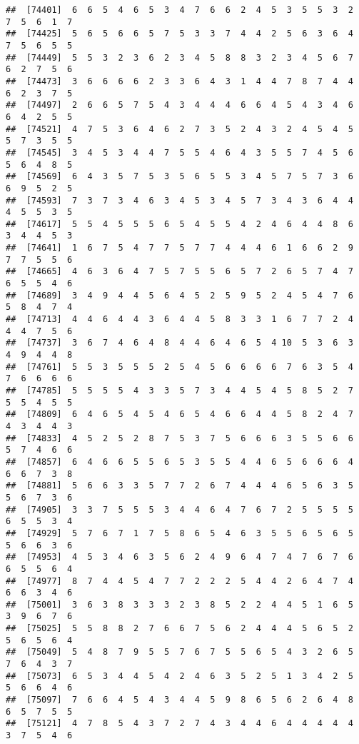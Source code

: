 \documentclass[
]{book}
\begin{document}
\begin{verbatim}
##  [74401]  6  6  5  4  6  5  3  4  7  6  6  2  4  5  3  5  5  3  2  7  5  6  1  7
##  [74425]  5  6  5  6  6  5  7  5  3  3  7  4  4  2  5  6  3  6  4  7  5  6  5  5
##  [74449]  5  5  3  2  3  6  2  3  4  5  8  8  3  2  3  4  5  6  7  6  2  7  5  6
##  [74473]  3  6  6  6  6  2  3  3  6  4  3  1  4  4  7  8  7  4  4  6  2  3  7  5
##  [74497]  2  6  6  5  7  5  4  3  4  4  4  6  6  4  5  4  3  4  6  6  4  2  5  5
##  [74521]  4  7  5  3  6  4  6  2  7  3  5  2  4  3  2  4  5  4  5  5  7  3  5  5
##  [74545]  3  4  5  3  4  4  7  5  5  4  6  4  3  5  5  7  4  5  6  5  6  4  8  5
##  [74569]  6  4  3  5  7  5  3  5  6  5  5  3  4  5  7  5  7  3  6  6  9  5  2  5
##  [74593]  7  3  7  3  4  6  3  4  5  3  4  5  7  3  4  3  6  4  4  4  5  5  3  5
##  [74617]  5  5  4  5  5  5  6  5  4  5  5  4  2  4  6  4  4  8  6  3  4  4  5  3
##  [74641]  1  6  7  5  4  7  7  5  7  7  4  4  4  6  1  6  6  2  9  7  7  5  5  6
##  [74665]  4  6  3  6  4  7  5  7  5  5  6  5  7  2  6  5  7  4  7  6  5  5  4  6
##  [74689]  3  4  9  4  4  5  6  4  5  2  5  9  5  2  4  5  4  7  6  5  8  4  7  4
##  [74713]  4  4  6  4  4  3  6  4  4  5  8  3  3  1  6  7  7  2  4  4  4  7  5  6
##  [74737]  3  6  7  4  6  4  8  4  4  6  4  6  5  4 10  5  3  6  3  4  9  4  4  8
##  [74761]  5  5  3  5  5  5  2  5  4  5  6  6  6  6  7  6  3  5  4  7  6  6  6  6
##  [74785]  5  5  5  5  4  3  3  5  7  3  4  4  5  4  5  8  5  2  7  5  5  4  5  5
##  [74809]  6  4  6  5  4  5  4  6  5  4  6  6  4  4  5  8  2  4  7  4  3  4  4  3
##  [74833]  4  5  2  5  2  8  7  5  3  7  5  6  6  6  3  5  5  6  6  5  7  4  6  6
##  [74857]  6  4  6  6  5  5  6  5  3  5  5  4  4  6  5  6  6  6  4  6  6  7  3  8
##  [74881]  5  6  6  3  3  5  7  7  2  6  7  4  4  4  6  5  6  3  5  5  6  7  3  6
##  [74905]  3  3  7  5  5  5  3  4  4  6  4  7  6  7  2  5  5  5  5  6  5  5  3  4
##  [74929]  5  7  6  7  1  7  5  8  6  5  4  6  3  5  5  6  5  6  5  5  6  6  3  6
##  [74953]  4  5  3  4  6  3  5  6  2  4  9  6  4  7  4  7  6  7  6  6  5  5  6  4
##  [74977]  8  7  4  4  5  4  7  7  2  2  2  5  4  4  2  6  4  7  4  6  6  3  4  6
##  [75001]  3  6  3  8  3  3  3  2  3  8  5  2  2  4  4  5  1  6  5  3  9  6  7  6
##  [75025]  5  5  8  8  2  7  6  6  7  5  6  2  4  4  4  5  6  5  2  5  6  5  6  4
##  [75049]  5  4  8  7  9  5  5  7  6  7  5  5  6  5  4  3  2  6  5  7  6  4  3  7
##  [75073]  6  5  3  4  4  5  4  2  4  6  3  5  2  5  1  3  4  2  5  5  6  6  4  6
##  [75097]  7  6  6  4  5  4  3  4  4  5  9  8  6  5  6  2  6  4  8  6  5  7  5  5
##  [75121]  4  7  8  5  4  3  7  2  7  4  3  4  4  6  4  4  4  4  4  3  7  5  4  6

\end{verbatim}
\end{document}
